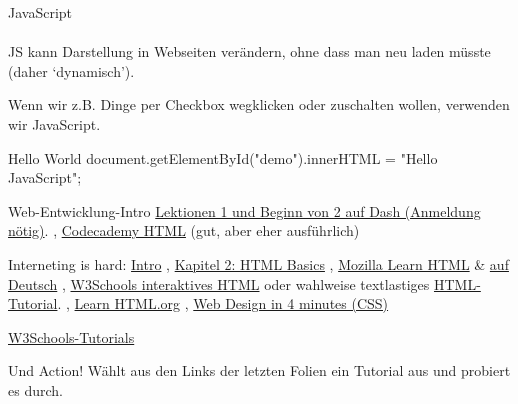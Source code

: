 \begin{frame}{JavaScript}
\\
\\
JS kann Darstellung in Webseiten verändern, ohne dass man neu laden müsste (daher `dynamisch').

Wenn wir z.B. Dinge per Checkbox wegklicken oder zuschalten wollen, verwenden wir JavaScript.

\begin{myjs}{Hello World}
document.getElementById("demo").innerHTML = "Hello JavaScript";
\end{myjs}

\end{frame}

\begin{frame}[allowframebreaks]{Web-Entwicklung-Intro}
\scriptsize
{}
\href{https://dash.generalassemb.ly/projects}{Lektionen 1 und Beginn von 2 auf Dash (Anmeldung nötig)}. \sep 
\href{https://www.codecademy.com/learn/learn-html}{Codecademy HTML} (gut, aber eher ausführlich)


Interneting is hard:
\href{https://internetingishard.com/html-and-css/introduction/}{Intro} \sep
\href{https://internetingishard.com/html-and-css/basic-web-pages/}{Kapitel 2: HTML Basics}
\sep 
\href{https://developer.mozilla.org/en-US/docs/Learn/HTML/Introduction_to_HTML/Getting_started}{Mozilla Learn HTML} \& \href{https://developer.mozilla.org/de/docs/Learn/HTML}{auf Deutsch}
\sep
\href{https://www.w3schools.com/html/exercise.asp}{W3Schools interaktives HTML} oder wahlweise textlastiges \href{https://www.w3schools.com/html/default.asp}{HTML-Tutorial}. \sep
\href{https://www.learn-html.org/en/Basic_Elements}{Learn HTML.org} \sep
\href{https://jgthms.com/web-design-in-4-minutes/}{Web Design in 4 minutes (CSS)}
\smallskip


\href{https://www.w3schools.com/html/html_responsive.asp}{W3Schools-Tutorials}

\end{frame}




\begin{frame}[standout]
  \alert{Und Action!} \normalsize
 Wählt aus den Links der letzten Folien ein Tutorial aus und probiert es durch.
\end{frame}



